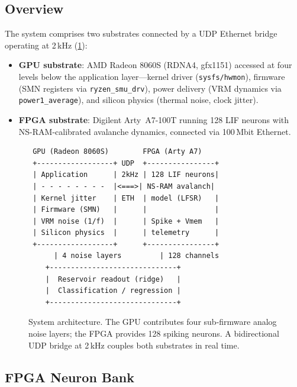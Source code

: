 \documentclass[11pt]{article}
\begin{document}
\subsection{Overview}

The system comprises two substrates connected by a
UDP Ethernet bridge operating at 2\,kHz
(\cref{fig:architecture}):

\begin{itemize}[leftmargin=1.5em, itemsep=2pt]
  \item \textbf{GPU substrate}: AMD Radeon 8060S (RDNA4,
    gfx1151) accessed at four levels below the application
    layer---kernel driver (\texttt{sysfs/hwmon}), firmware
    (SMN registers via \texttt{ryzen\_smu\_drv}), power
    delivery (VRM dynamics via \texttt{power1\_average}),
    and silicon physics (thermal noise, clock jitter).
  \item \textbf{FPGA substrate}: Digilent Arty~A7-100T
    running 128 LIF neurons with NS-RAM-calibrated avalanche
    dynamics, connected via 100\,Mbit Ethernet.
\end{itemize}

\begin{figure}[t]
\centering
\small
{\scriptsize
\begin{verbatim}
 GPU (Radeon 8060S)        FPGA (Arty A7)
 +------------------+ UDP  +----------------+
 | Application      | 2kHz | 128 LIF neurons|
 | - - - - - - - -  |<===>| NS-RAM avalanch|
 | Kernel jitter    | ETH  | model (LFSR)   |
 | Firmware (SMN)   |      |                |
 | VRM noise (1/f)  |      | Spike + Vmem   |
 | Silicon physics  |      | telemetry      |
 +------------------+      +----------------+
      | 4 noise layers         | 128 channels
    +------------------------------+
    |  Reservoir readout (ridge)   |
    |  Classification / regression |
    +------------------------------+
\end{verbatim}
}
\caption{System architecture.  The GPU contributes four
  sub-firmware analog noise layers; the FPGA provides 128
  spiking neurons.  A bidirectional UDP bridge at 2\,kHz
  couples both substrates in real time.}
\label{fig:architecture}
\end{figure}

\subsection{FPGA Neuron Bank}
\label{sec:fpga}
\end{document}
